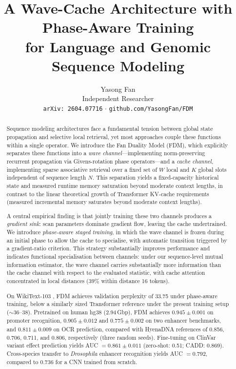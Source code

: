\documentclass{article}
\title{\textbf{A Wave-Cache Architecture with Phase-Aware Training\\
for Language and Genomic Sequence Modeling}}
\author{
  Yasong Fan\\
  Independent Researcher\\
  \texttt{arXiv: 2604.07716} $\cdot$ \texttt{github.com/YasongFan/FDM}
}
\date{}
\newcommand{\citenum}[1]{%
  \textsuperscript{\rmfamily\upshape[#1]}}
\begin{document}
\maketitle

\begin{abstract}
Sequence modeling architectures face a fundamental tension between
global state propagation and selective local retrieval, yet most
approaches couple these functions within a single operator.
We introduce the Fan Duality Model (FDM), which explicitly separates
these functions into a \emph{wave channel}---implementing
norm-preserving recurrent propagation via Givens-rotation phase
operators---and a \emph{cache channel}, implementing sparse associative
retrieval over a fixed set of $W$ local and $K$ global slots independent
of sequence length $N$.
This separation yields a fixed-capacity historical state and measured
runtime memory saturation beyond moderate context lengths, in contrast
to the linear theoretical growth of Transformer KV-cache requirements
(measured incremental memory saturates beyond moderate context lengths).

A central empirical finding is that jointly training these two channels
produces a \emph{gradient sink}: scan parameters dominate gradient flow,
leaving the cache undertrained.
We introduce \emph{phase-aware staged training}, in which the wave
channel is frozen during an initial phase to allow the cache to
specialise, with automatic transition triggered by a gradient-ratio
criterion.
This strategy substantially improves performance and indicates functional
specialisation between channels: under our sequence-level mutual
information estimator, the wave channel carries substantially more
information than the cache channel with respect to the evaluated
statistic, with cache attention concentrated in local distances
(39\% within distance 16 tokens).

On WikiText-103\citenum{1}, FDM achieves validation perplexity of 33.75
under phase-aware training, below a similarly sized Transformer reference
under the present training setup ($\sim$36--38).
Pretrained on human hg38 (2.94\,Gbp), FDM achieves $0.945 \pm 0.001$
on promoter recognition, $0.905 \pm 0.012$ and $0.775 \pm 0.002$ on
two enhancer benchmarks, and $0.811 \pm 0.009$ on OCR prediction,
compared with HyenaDNA\citenum{2} references of 0.856, 0.706, 0.711,
and 0.806, respectively (three random seeds).
Fine-tuning on ClinVar variant effect prediction yields
AUC $= 0.861 \pm 0.011$ (zero-shot: 0.51; CADD: 0.869).
Cross-species transfer to \emph{Drosophila} enhancer recognition yields
AUC $= 0.792$, compared to 0.736 for a CNN trained from scratch.
\end{abstract}
\end{document}
